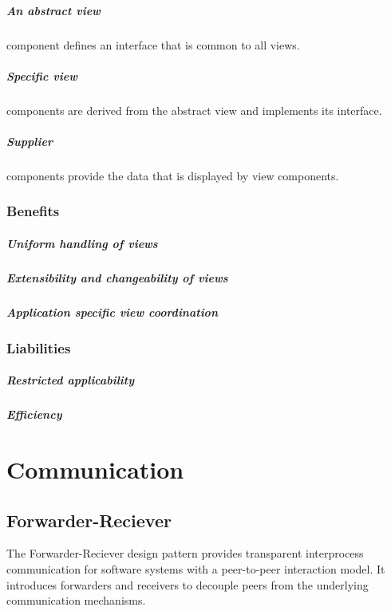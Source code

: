\documentclass[a4paper,11pt,twocolumn]{report}
\begin{document}
    \paragraph{An abstract view} component defines an interface that is common
    to all views.
    \paragraph{Specific view} components are derived from the abstract view and
    implements its interface.
    \paragraph{Supplier} components provide the data that is displayed by view
    components.
    \subsection{Benefits}
    \paragraph{Uniform handling of views}
    \paragraph{Extensibility and changeability of views}
    \paragraph{Application specific view coordination}
    \subsection{Liabilities}
    \paragraph{Restricted applicability}
    \paragraph{Efficiency}
    
    
    \chapter{Communication}

    \section{Forwarder-Reciever}
    The Forwarder-Reciever design pattern provides transparent interprocess
    communication for software systems with a peer-to-peer interaction model.
    It introduces forwarders and receivers to decouple peers from the
    underlying communication mechanisms.
\end{document}
